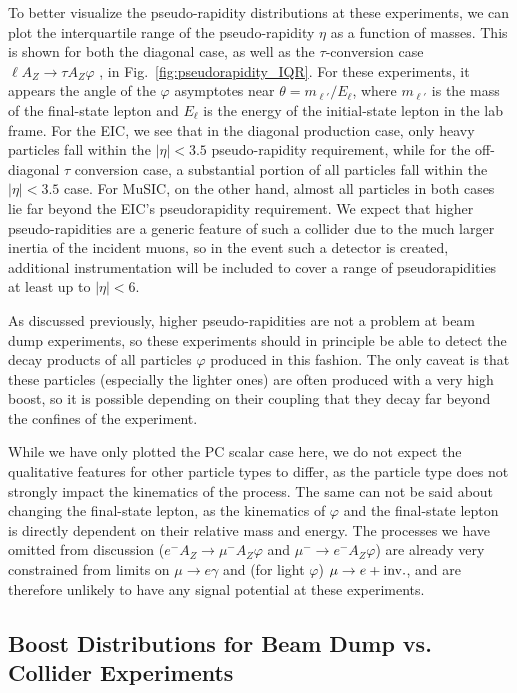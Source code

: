 To better visualize the pseudo-rapidity distributions at these experiments, we can plot the interquartile range of the pseudo-rapidity $\eta$ as a function of masses. This is shown for both the diagonal case, as well as the $\tau$-conversion case $\ell A_Z \rightarrow \tau A_Z\varphi$ , in Fig.~\ref{fig:pseudorapidity_IQR}. For these experiments, it appears the angle of the $\varphi$ asymptotes near $\theta = m_{\ell'}/E_\ell$, where $m_{\ell'}$ is the mass of the final-state lepton and $E_\ell$ is the energy of the initial-state lepton in the lab frame. For the EIC, we see that in the diagonal production case, only heavy particles fall within the $|\eta| < 3.5$ pseudo-rapidity requirement, while for the off-diagonal $\tau$ conversion case, a substantial portion of all particles fall within the $|\eta| < 3.5$ case. For MuSIC, on the other hand, almost all particles in both cases lie far beyond the EIC's pseudorapidity requirement. We expect that higher pseudo-rapidities are a generic feature of such a collider due to the much larger inertia of the incident muons, so in the event such a detector is created, additional instrumentation will be included to cover a range of pseudorapidities at least up to $|\eta| < 6$.

As discussed previously, higher pseudo-rapidities are not a problem at beam dump experiments, so these experiments should in principle be able to detect the decay products of all particles $\varphi$ produced in this fashion. The only caveat is that these particles (especially the lighter ones) are often produced with a very high boost, so it is possible depending on their coupling that they decay far beyond the confines of the experiment.

While we have only plotted the PC scalar case here, we do not expect the qualitative features for other particle types to differ, as the particle type does not strongly impact the kinematics of the process. The same can not be said about changing the final-state lepton, as the kinematics of $\varphi$ and the final-state lepton is directly dependent on their relative mass and energy. The processes we have omitted from discussion ($e^- A_Z \rightarrow \mu^- A_Z\varphi$ and $\mu^- \rightarrow e^- A_Z\varphi$) are already very constrained from limits on $\mu \rightarrow e\gamma$ and (for light $\varphi$) $\mu \rightarrow e+{\rm inv.}$, and are therefore unlikely to have any signal potential at these experiments.

\subsection{Boost Distributions for Beam Dump vs. Collider Experiments}\label{sec:phi_boost}

